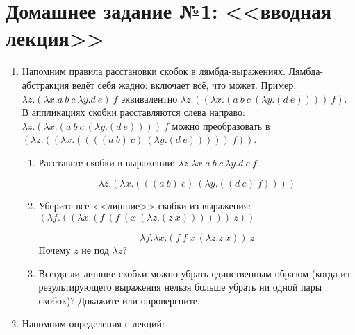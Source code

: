 

\cfoot{}



\section*{Домашнее задание №1: <<вводная лекция>>}

\begin{enumerate}

    \item Напомним правила расстановки скобок в лямбда-выражениях. Лямбда-абстракция ведёт себя жадно:
          включает всё, что может. Пример: $\lambda z.(\lambda x.a\ b\ c\ \lambda y.d\ e)\ f$
          эквивалентно $\lambda z.((\lambda x.(a\ b\ c\ (\lambda y.(d\ e))))\ f)$.
          В аппликациях скобки расставляются слева направо:
          $\lambda z.(\lambda x.(a\ b\ c\ (\lambda y.(d\ e))))\ f$ можно преобразовать в
          $(\lambda z.((\lambda x.((((a\ b)\ c)\ (\lambda y.(d\ e)))))\ f))$.

          \begin{enumerate}
              \item Расставьте скобки в выражении:
                    $\lambda z.\lambda x.a\ b\ c\ \lambda y.d\ e\ f$
                    \begin{solution}
                        \[\lambda z.(\lambda x.(((a\ b)\ c)\ (\lambda y.((d\ e)\ f))))\]
                    \end{solution}

              \item Уберите все <<лишние>> скобки из выражения:
                    $(\lambda f.((\lambda x.(f\ (f\ (x\ (\lambda z.(z\ x))))))\ z))$
                    \begin{solution}
                        \[\lambda f.\lambda x.(f\ f\ x\ (\lambda z.z\ x))\ z\]
                        Почему \(z\) не под \(\lambda z\)?
                    \end{solution}
              \item Всегда ли лишние скобки можно убрать единственным образом (когда из результирующего
                    выражения нельзя больше убрать ни одной пары скобок)? Докажите или опровергните.
          \end{enumerate}

    \item Напомним определения с лекций:


\end{enumerate}
